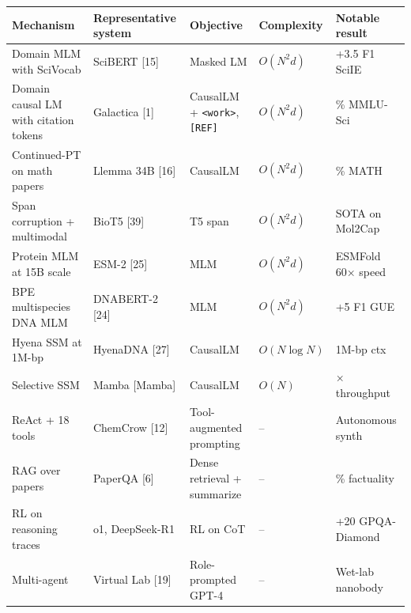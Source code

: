 {\def\LTcaptype{none} %
\begin{longtable}[]{@{}
  >{\raggedright\arraybackslash}p{}
  >{\raggedright\arraybackslash}p{}
  >{\raggedright\arraybackslash}p{}
  >{\raggedright\arraybackslash}p{}
  >{\raggedright\arraybackslash}p{}@{}}
\toprule\noalign{}
\begin{minipage}[b]{\linewidth}\raggedright
Mechanism
\end{minipage} & \begin{minipage}[b]{\linewidth}\raggedright
Representative system
\end{minipage} & \begin{minipage}[b]{\linewidth}\raggedright
Objective
\end{minipage} & \begin{minipage}[b]{\linewidth}\raggedright
Complexity
\end{minipage} & \begin{minipage}[b]{\linewidth}\raggedright
Notable result
\end{minipage} \\
\midrule\noalign{}
\endhead
\bottomrule\noalign{}
\endlastfoot
Domain MLM with SciVocab & SciBERT {[}15{]} & Masked LM & \(O(N^2 d)\) & +3.5 F1 SciIE \\
Domain causal LM with citation tokens & Galactica {[}1{]} & CausalLM + \texttt{\textless{}work\textgreater{}}, \texttt{{[}REF{]}} & \(O(N^2 d)\) & 68.2\% MMLU-Sci \\
Continued-PT on math papers & Llemma 34B {[}16{]} & CausalLM & \(O(N^2 d)\) & 25.0\% MATH \\
Span corruption + multimodal & BioT5 {[}39{]} & T5 span & \(O(N^2 d)\) & SOTA on Mol2Cap \\
Protein MLM at 15B scale & ESM-2 {[}25{]} & MLM & \(O(N^2 d)\) & ESMFold 60× speed \\
BPE multispecies DNA MLM & DNABERT-2 {[}24{]} & MLM & \(O(N^2 d)\) & +5 F1 GUE \\
Hyena SSM at 1M-bp & HyenaDNA {[}27{]} & CausalLM & \(O(N \log N)\) & 1M-bp ctx \\
Selective SSM & Mamba {[}Mamba{]} & CausalLM & \(O(N)\) & 5× throughput \\
ReAct + 18 tools & ChemCrow {[}12{]} & Tool-augmented prompting & -- & Autonomous synth \\
RAG over papers & PaperQA {[}6{]} & Dense retrieval + summarize & -- & 73\% factuality \\
RL on reasoning traces & o1, DeepSeek-R1 & RL on CoT & -- & +20 GPQA-Diamond \\
Multi-agent & Virtual Lab {[}19{]} & Role-prompted GPT-4 & -- & Wet-lab nanobody \\
\end{longtable}
}


